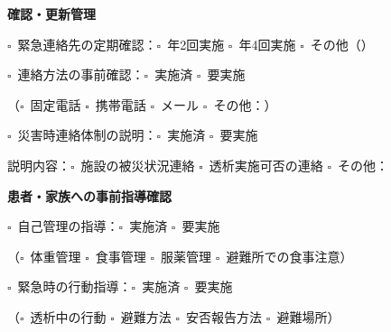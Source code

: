 \documentclass[a4paper,12pt]{jarticle}
\newcommand{\checkbox}{$\square$\ }
\newcommand{\underlinespace}[1]{\underline{\hspace{#1}}}
\begin{document}
\begin{center}
\textbf{\large 確認・更新管理}
\end{center}

\vspace{3mm}

\noindent
\checkbox 緊急連絡先の定期確認：\checkbox 年2回実施 \quad \checkbox 年4回実施 \quad \checkbox その他（\underlinespace{3cm}）

\vspace{3mm}

\noindent
\checkbox 連絡方法の事前確認：\checkbox 実施済 \quad \checkbox 要実施

\vspace{2mm}

\noindent
（\checkbox 固定電話 \quad \checkbox 携帯電話 \quad \checkbox メール \quad \checkbox その他：\underlinespace{4cm}）

\vspace{3mm}

\noindent
\checkbox 災害時連絡体制の説明：\checkbox 実施済 \quad \checkbox 要実施

\vspace{2mm}

\noindent
説明内容：\checkbox 施設の被災状況連絡 \quad \checkbox 透析実施可否の連絡 \quad \checkbox その他：\underlinespace{5cm}

\vspace{8mm}

\begin{center}
\textbf{\large 患者・家族への事前指導確認}
\end{center}

\vspace{3mm}

\noindent
\checkbox 自己管理の指導：\checkbox 実施済 \quad \checkbox 要実施

\vspace{2mm}

\noindent
（\checkbox 体重管理 \quad \checkbox 食事管理 \quad \checkbox 服薬管理 \quad \checkbox 避難所での食事注意）

\vspace{3mm}

\noindent
\checkbox 緊急時の行動指導：\checkbox 実施済 \quad \checkbox 要実施

\vspace{2mm}

\noindent
（\checkbox 透析中の行動 \quad \checkbox 避難方法 \quad \checkbox 安否報告方法 \quad \checkbox 避難場所）
\end{document}
